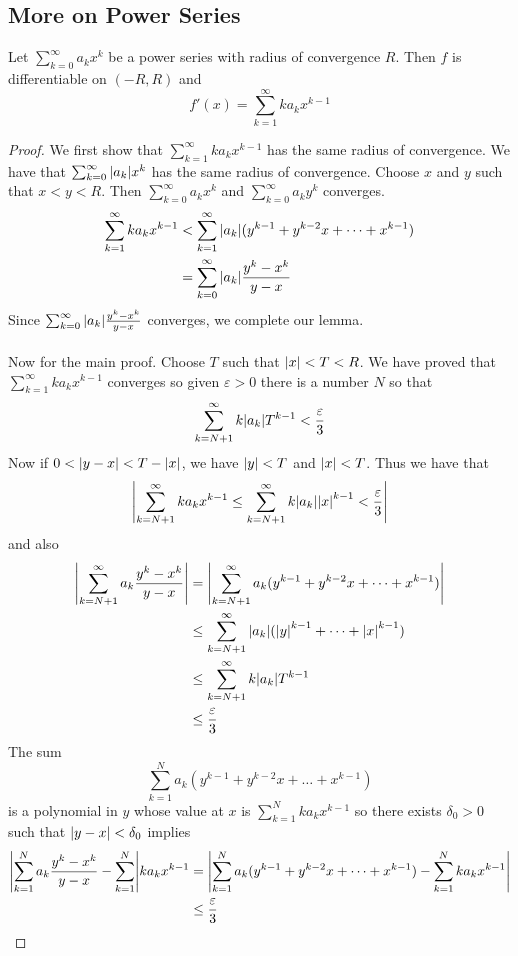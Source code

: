\documentclass[a4paper]{article}
\begin{document}
\subsection{More on Power Series}
\begin{thm}{}{} Let $\sum_{k=0}^\infty a_kx^k$ be a power series with radius of convergence $R$. Then $f$ is differentiable on $(-R,R)$ and $$f'(x)=\sum_{k=1}^\infty ka_kx^{k-1}$$ \tcbline
\begin{proof} We first show that $\sum_{k=1}^\infty ka_kx^{k-1}$ has the same radius of convergence. We have that $\sum_{k=0}^\infty \abs{a_k}x^k$ has the same radius of convergence. Choose $x$ and $y$ such that $x<y<R$. Then $\sum_{k=0}^\infty a_kx^k$ and $\sum_{k=0}^\infty a_ky^k$ converges. 
\begin{align*}
\sum_{k=1}^\infty ka_kx^{k-1}&<\sum_{k=1}^\infty\abs{a_k}(y^{k-1}+y^{k-2}x+\dots+x^{k-1})\\
&=\sum_{k=0}^\infty\abs{a_k}\frac{y^k-x^k}{y-x}
\end{align*}
Since $\sum_{k=0}^\infty\abs{a_k}\frac{y^k-x^k}{y-x}$ converges, we complete our lemma. \\~\\
Now for the main proof. Choose $T$ such that $\abs{x}<T<R$. We have proved that $\sum_{k=1}^\infty ka_kx^{k-1}$ converges so given $\varepsilon>0$ there is a number $N$ so that $$\sum_{k=N+1}^\infty k\abs{a_k}T^{k-1}<\frac{\varepsilon}{3}$$ Now if $0<\abs{y-x}<T-\abs{x}$, we have $\abs{y}<T$ and $\abs{x}<T$. Thus we have that $$\abs{\sum_{k=N+1}^\infty ka_kx^{k-1}\leq\sum_{k=N+1}^\infty k\abs{a_k}\abs{x}^{k-1}<\frac{\varepsilon}{3}}$$ and also
\begin{align*}
\abs{\sum_{k=N+1}^\infty a_k\frac{y^k-x^k}{y-x}}&=\abs{\sum_{k=N+1}^\infty a_k(y^{k-1}+y^{k-2}x+\dots+x^{k-1})}\\
&\leq\sum_{k=N+1}^\infty\abs{a_k}(\abs{y}^{k-1}+\dots+\abs{x}^{k-1})\\
&\leq\sum_{k=N+1}^\infty k\abs{a_k}T^{k-1}\\
&\leq\frac{\varepsilon}{3}
\end{align*} The sum $$\sum_{k=1}^Na_k(y^{k-1}+y^{k-2}x+\dots+x^{k-1})$$ is a polynomial in $y$ whose value at $x$ is $\sum_{k=1}^Nka_kx^{k-1}$ so there exists $\delta_0>0$ such that $\abs{y-x}<\delta_0$ implies 
\begin{align*}
\abs{\sum_{k=1}^Na_k\frac{y^k-x^k}{y-x}-\sum_{k=1}^N}ka_kx^{k-1}&=\abs{\sum_{k=1}^Na_k(y^{k-1}+y^{k-2}x+\dots+x^{k-1})-\sum_{k=1}^Nka_kx^{k-1}}\\
&\leq\frac{\varepsilon}{3}

\end{align*}
\end{proof}
\end{thm}
\end{document}
